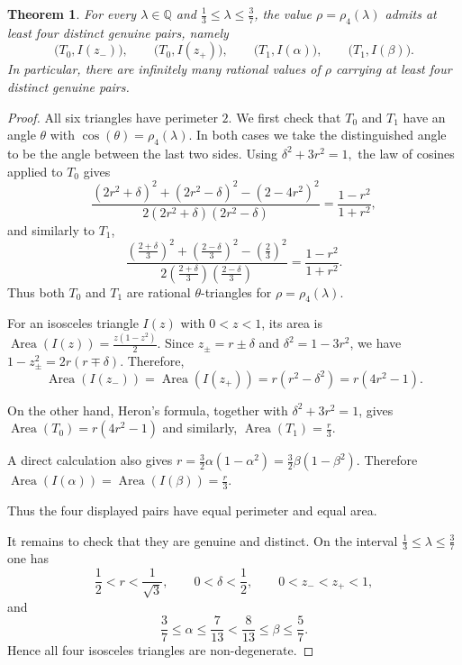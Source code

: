 \documentclass[11pt]{amsart}
\theoremstyle{plain}
\newtheorem{thm}{Theorem}[section]
\theoremstyle{remark}
\theoremstyle{plain}
\newcommand{\Q}{\mathbb{Q}}
\begin{document}
\begin{thm}\label{thm:four-pair-rational}
For every
$\lambda\in\Q$ and $\frac13\leq\lambda\leq\frac37$,
the value
$\rho=\rho_4(\lambda)$
admits at least four distinct genuine pairs, namely
\[
\bigl(T_0,I(z_-)\bigr),
\qquad
\bigl(T_0,I(z_+)\bigr),
\qquad
\bigl(T_1,I(\alpha)\bigr),
\qquad
\bigl(T_1,I(\beta)\bigr).
\]
In particular, there are infinitely many rational values of $\rho$
carrying at least four distinct genuine pairs.
\end{thm}

\begin{proof}
All six triangles have perimeter $2$. We first check that $T_0$ and
$T_1$ have an angle $\theta$ with
$\cos(\theta)=\rho_4(\lambda)$.
In both cases we take the distinguished angle to be the angle between
the last two sides. Using
$\delta^2+3r^2=1,$
the law of cosines applied to $T_0$ gives
\[
\frac{(2r^2+\delta)^2+(2r^2-\delta)^2-(2-4r^2)^2}
     {2(2r^2+\delta)(2r^2-\delta)}
=
\frac{1-r^2}{1+r^2},
\]
and similarly to $T_1$,
\[
\frac{\left(\frac{2+\delta}{3}\right)^2
      +\left(\frac{2-\delta}{3}\right)^2
      -\left(\frac23\right)^2}
     {2\left(\frac{2+\delta}{3}\right)
        \left(\frac{2-\delta}{3}\right)}
=
\frac{1-r^2}{1+r^2}.
\]
Thus both $T_0$ and $T_1$ are rational $\theta$-triangles for
$\rho=\rho_4(\lambda)$.

For an isosceles triangle $I(z)$ with $0<z<1$, its area is
$\operatorname{Area}(I(z)) = \frac{z(1-z^2)}{2}$.
Since
$z_\pm=r\pm\delta$
and $\delta^2=1-3r^2$, we have
$1-z_\pm^2 = 2r(r\mp\delta)$.
Therefore,
\[
\operatorname{Area}(I(z_-))
=
\operatorname{Area}(I(z_+))
=
r(r^2-\delta^2)
=
r(4r^2-1).
\]

On the other hand, Heron's formula, together with
$\delta^2+3r^2=1$, gives
$\operatorname{Area}(T_0)=r(4r^2-1)$ and similarly, $\operatorname{Area}(T_1) = \frac r3$.


A direct calculation also gives
$r = \frac32\alpha(1-\alpha^2) = \frac32\beta(1-\beta^2)$.
Therefore
$\operatorname{Area}(I(\alpha)) = \operatorname{Area}(I(\beta)) = \frac r3$.

Thus the four displayed pairs have equal perimeter and equal area.

It remains to check that they are genuine and distinct. On the interval
$\frac13\leq\lambda\leq\frac37$
one has
\[
\frac12<r<\frac1{\sqrt3},
\qquad
0<\delta<\frac12,
\qquad
0<z_-<z_+<1,
\]
and
\[
\frac37\leq \alpha\leq\frac7{13}
<
\frac8{13}\leq \beta\leq\frac57.
\]
Hence all four isosceles triangles are non-degenerate.


\end{proof}
\end{document}
